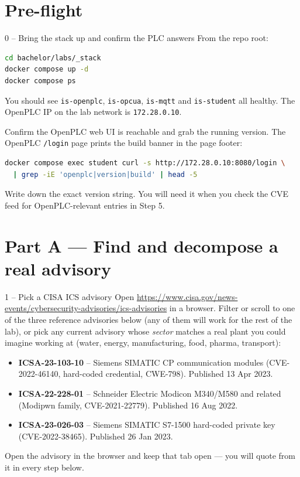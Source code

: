 \documentclass[11pt,a4paper]{article}
\begin{document}
\section*{Pre-flight}

\begin{stepbox}{0 -- Bring the stack up and confirm the PLC answers}
From the repo root:
\begin{lstlisting}[language=bash]
cd bachelor/labs/_stack
docker compose up -d
docker compose ps
\end{lstlisting}
You should see \texttt{is-openplc}, \texttt{is-opcua}, \texttt{is-mqtt} and \texttt{is-student} all healthy. The OpenPLC IP on the lab network is \texttt{172.28.0.10}.

Confirm the OpenPLC web UI is reachable and grab the running version. The OpenPLC \texttt{/login} page prints the build banner in the page footer:
\begin{lstlisting}[language=bash]
docker compose exec student curl -s http://172.28.0.10:8080/login \
  | grep -iE 'openplc|version|build' | head -5
\end{lstlisting}
Write down the exact version string. You will need it when you check the CVE feed for OpenPLC-relevant entries in Step 5.
\end{stepbox}

\section*{Part A --- Find and decompose a real advisory}

\begin{stepbox}{1 -- Pick a CISA ICS advisory}
Open \url{https://www.cisa.gov/news-events/cybersecurity-advisories/ics-advisories} in a browser. Filter or scroll to one of the three reference advisories below (any of them will work for the rest of the lab), or pick any current advisory whose \emph{sector} matches a real plant you could imagine working at (water, energy, manufacturing, food, pharma, transport):

\begin{itemize}\setlength{\itemsep}{1pt}
  \item \textbf{ICSA-23-103-10} -- Siemens SIMATIC CP communication modules (CVE-2022-46140, hard-coded credential, CWE-798). Published 13 Apr 2023.
  \item \textbf{ICSA-22-228-01} -- Schneider Electric Modicon M340/M580 and related (Modipwn family, CVE-2021-22779). Published 16 Aug 2022.
  \item \textbf{ICSA-23-026-03} -- Siemens SIMATIC S7-1500 hard-coded private key (CVE-2022-38465). Published 26 Jan 2023.
\end{itemize}

Open the advisory in the browser and keep that tab open --- you will quote from it in every step below.
\end{stepbox}
\end{document}
